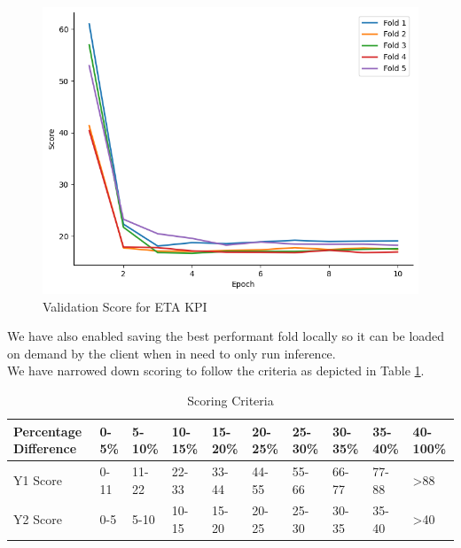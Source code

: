 \documentclass{report} %
\begin{document}
\begin{figure}[H]
    \hfill
    \begin{minipage}[b]{0.325\textwidth}
        \includegraphics[width=\textwidth]{./ReportImages/val_score_y2.png}
        \caption{\centering Validation Score for ETA \ac{KPI}}
        \label{fig:Validation Score for ETA grid}
    \end{minipage}
\end{figure}

We have also enabled saving the best performant fold locally so it can be loaded on demand by the client when in need to only run inference.\\
We have narrowed down scoring to follow the criteria as depicted in Table \ref{tab:Scoring Criteria}.

\begin{table}[H]
    \centering
    \begin{tabularx}{1\linewidth}{|X|X|X|X|X|X|X|X|X|X|}
    \hline {\bf Percentage Difference} & {\bf 0-5\%} & {\bf 5-10\%} & {\bf 10-15\%} & {\bf 15-20\%} & {\bf 20-25\%} & {\bf 25-30\%} & {\bf 30-35\%} & {\bf 35-40\%} & {\bf 40-100\%}\\
    \hline 
    Y1 Score& 0-11& 11-22 & 22-33 & 33-44 & 44-55& 55-66 & 66-77 & 77-88 & \textgreater 88\\
    Y2 Score& 0-5 & 5-10 & 10-15 & 15-20 & 20-25& 25-30 & 30-35 & 35-40 &\textgreater 40\\
    \hline
    \end{tabularx}
    \caption{Scoring Criteria}
    \label{tab:Scoring Criteria}
\end{table}
\end{document}
